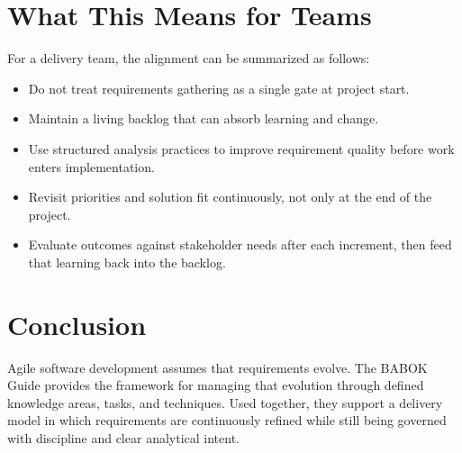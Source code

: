 \documentclass[11pt]{article}
\begin{document}
\section{What This Means for Teams}

For a delivery team, the alignment can be summarized as follows:

\begin{itemize}
  \item Do not treat requirements gathering as a single gate at project start.
  \item Maintain a living backlog that can absorb learning and change.
  \item Use structured analysis practices to improve requirement quality before work enters implementation.
  \item Revisit priorities and solution fit continuously, not only at the end of the project.
  \item Evaluate outcomes against stakeholder needs after each increment, then feed that learning back into the backlog.
\end{itemize}

\section{Conclusion}

Agile software development assumes that requirements evolve. The BABOK Guide provides the framework for managing that evolution through defined knowledge areas, tasks, and techniques. Used together, they support a delivery model in which requirements are continuously refined while still being governed with discipline and clear analytical intent.\cite{scrumguide,babokmain,baboktasks}
\end{document}
